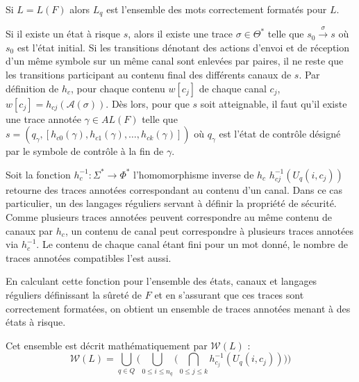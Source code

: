 Si $L=L(F)$ alors $L_q$ est l'ensemble des mots correctement formatés pour $L$.

Si il existe un état à risque $s$, alors il existe une trace $\sigma \in \Theta^*$ telle que $s_0\xrightarrow{\sigma}s$ où $s_0$ est l'état initial. Si les transitions dénotant des actions d'envoi et de réception d'un même symbole sur un même canal sont enlevées par paires, il ne reste que les transitions participant au contenu final des différents canaux de $s$. Par définition de $h_c$, pour chaque contenu $w[c_j]$ de chaque canal $c_j$, $w[c_j]=h_{cj}(\mathcal{A}(\sigma))$. Dès lors, pour que $s$ soit atteignable, il faut qu'il existe une trace annotée $\gamma \in AL(F)$ telle que $s=(q_\gamma, [h_{c0}(\gamma),h_{c1}(\gamma),\dots,h_{ck}(\gamma)])$ où $q_\gamma$ est l'état de contrôle désigné par le symbole de contrôle à la fin de $\gamma$.

Soit la fonction $h^{-1}_{c}:\Sigma^*\rightarrow\Phi^*$ l'homomorphisme inverse de $h_c$ $h^{-1}_{cj}(U_q(i,c_j))$ retourne des traces annotées correspondant au contenu d'un canal. Dans ce cas particulier, un des langages réguliers servant à définir la propriété de sécurité. Comme plusieurs traces annotées peuvent correspondre au même contenu de canaux par $h_c$, un contenu de canal peut correspondre à plusieurs traces annotées via $h^{-1}_c$. Le contenu de chaque canal étant fini pour un mot donné, le nombre de traces annotées compatibles l'est aussi.

En calculant cette fonction pour l'ensemble des états, canaux et langages réguliers définissant la sûreté de $F$ et en s'assurant que ces traces sont correctement formatées, on obtient un ensemble de traces annotées menant à des états à risque.

Cet ensemble est décrit mathématiquement par $\mathcal{W}(L)$ :
$$
\mathcal{W}(L)=\bigcup_{q\in Q}\big(\bigcup_{0\leq i\leq n_q}\big(\bigcap_{0\leq j \leq k}h_{c_j}^{-1}(U_q(i,c_j))\big)\big)
$$
